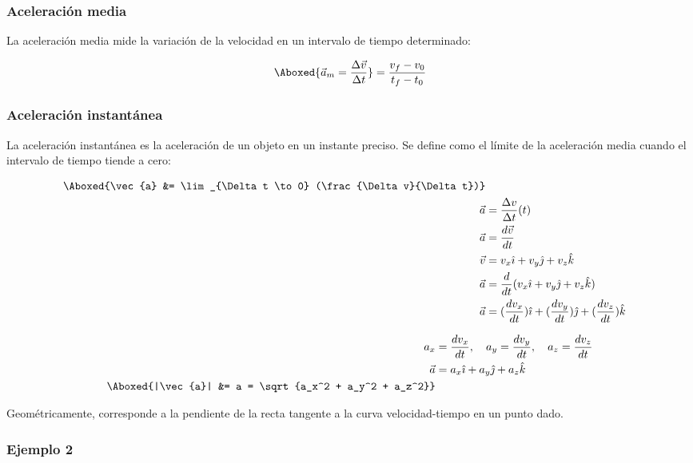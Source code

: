 \subsubsection{Aceleración media}
La aceleración media mide la variación de la velocidad en un intervalo de tiempo determinado:
\vspace{-20pt}

\begin{align*}
    \Aboxed{\displaystyle \vec{a}_m = \frac{\Delta \vec{v}}{\Delta t}} = \frac{v_f - v_0}{t_f - t_0}
\end{align*}

\subsubsection{Aceleración instantánea}

La aceleración instantánea es la aceleración de un objeto en un instante preciso. Se define como el límite de la aceleración media cuando el intervalo de tiempo tiende a cero:
\vspace{-20pt}

\begin{align*}
\Aboxed{\vec{a} &= \lim_{\Delta t \to 0} (\frac{\Delta v}{\Delta t})}\\
\vec{a} &= \frac{\Delta v}{\Delta t}(t) \\
\vec{a} &= \frac{d\vec{v}}{dt} \\
\vec{v} &= v_x \hat{\imath} + v_y \hat{\jmath} + v_z \hat{k} \\
\vec{a} &= \frac{d}{dt}(v_x \hat{\imath} + v_y \hat{\jmath} + v_z \hat{k}) \\
\vec{a} &= (\frac{dv_x}{dt})\hat{\imath} + (\frac{dv_y}{dt})\hat{\jmath} + (\frac{dv_z}{dt})\hat{k}
\end{align*}

\vspace{-10pt}

\begin{align*}
a_x &= \frac{dv_x}{dt}, \quad
a_y = \frac{dv_y}{dt}, \quad
a_z = \frac{dv_z}{dt}\\
\vec{a} &= a_x \hat{\imath} + a_y \hat{\jmath} + a_z \hat{k}\\
\Aboxed{|\vec{a}| &= a = \sqrt{a_x^2 + a_y^2 + a_z^2}}
\end{align*}

Geométricamente, corresponde a la pendiente de la recta tangente a la curva velocidad-tiempo en un punto dado.

\subsubsection{Ejemplo 2}

